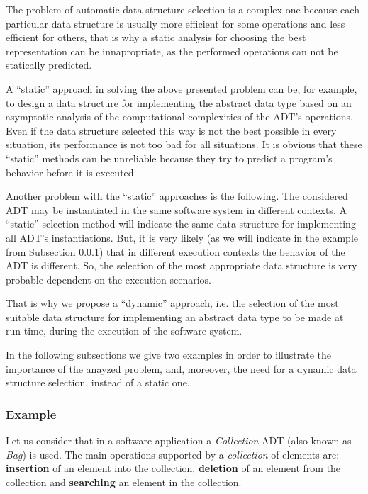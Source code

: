 The problem of automatic data structure selection is a complex one because each particular data structure is usually more efficient for some operations and less efficient for others, that is why a static analysis for choosing the best representation can be innapropriate, as the performed operations can not be statically predicted.  

A ``static'' approach in solving the above presented problem can be, for example, to design a data structure for implementing the abstract data type based on an asymptotic analysis of the computational complexities \cite{Cormen09Introduction} of the ADT's operations. Even if the data structure selected this way is not the best possible in every situation, its performance is not too bad for all situations. It is obvious that these ``static'' methods can be unreliable because they try to predict
a program's behavior before it is executed.

Another problem with the ``static'' approaches is the following. The considered ADT may be instantiated in the same software system in different contexts. A ``static'' selection method will indicate the same data structure for implementing all ADT's instantiations. But, it is very likely (as we will indicate in the example from Subsection \ref{ex}) that in different execution contexts the behavior of the ADT is different. So, the selection of the most appropriate data structure is very probable dependent on the execution scenarios.     

That is why we propose a ``dynamic'' approach, i.e. the selection of the most suitable data structure for implementing an abstract data type to be  made at run-time, during the execution of the software system. 

In the following subsections we give two examples in order to illustrate the importance of the anayzed problem, and, moreover, the need for a dynamic data structure selection, instead of a static one.
 
\subsubsection{Example}\label{ex} 
 
Let us consider that in a software application a \emph{Collection} ADT (also known as \emph{Bag}) is used. The main operations supported by a \emph{collection} of elements are: \textbf{insertion} of an element into the collection, \textbf{deletion} of an element from the collection and \textbf{searching} an element in the collection.

